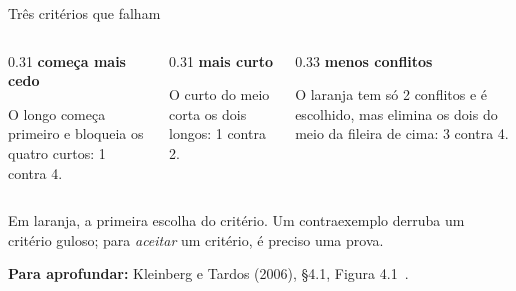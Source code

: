 \documentclass[aspectratio=169,xcolor=table]{beamer}
\newcommand{\fonte}[1]{%
  \vfill
  {\tiny\color{gray!55!black}\textbf{Para aprofundar:} #1\par}%
}
\begin{document}
\begin{frame}{Três critérios que falham}
  \begin{columns}[T]
    \begin{column}{0.31\textwidth}
      \centering\scriptsize\textbf{começa mais cedo}
      \smallskip

      \smallskip

      \tiny O longo começa primeiro e bloqueia os quatro curtos: 1 contra 4.
    \end{column}
    \begin{column}{0.31\textwidth}
      \centering\scriptsize\textbf{mais curto}
      \smallskip

      \smallskip

      \tiny O curto do meio corta os dois longos: 1 contra 2.
    \end{column}
    \begin{column}{0.33\textwidth}
      \centering\scriptsize\textbf{menos conflitos}
      \smallskip

      \smallskip

      \tiny O laranja tem só 2 conflitos e é escolhido, mas elimina os dois do meio da fileira
      de cima: 3 contra 4.
    \end{column}
  \end{columns}
  \bigskip
  {\small Em laranja, a primeira escolha do critério. Um contraexemplo derruba um critério
  guloso; para \emph{aceitar} um critério, é preciso uma prova.\par}
  \fonte{Kleinberg e Tardos (2006), \S 4.1, Figura 4.1~\cite{kleinberg2006algorithm}.}
\end{frame}
\end{document}
